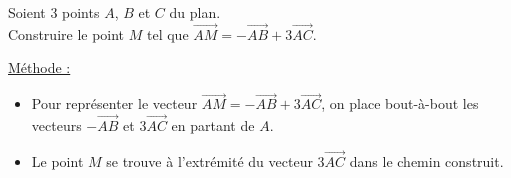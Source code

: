 \documentclass[12pt]{article}
\begin{document}
\begin{mdframed}[
    linewidth=1pt,
    roundcorner=5pt,
    linecolor=RoyalBlue,
    innertopmargin=10pt,
    innerbottommargin=10pt
]
\begin{minipage}{.45\textwidth}
\end{minipage}%
\hfill
\begin{minipage}{.55\textwidth}%
    Soient 3 points $A$, $B$ et $C$ du plan.
    \vspace{5pt}\\Construire le point $M$ tel que $\overrightarrow{AM} = -\overrightarrow{AB} + 
    3\overrightarrow{AC}$.
\end{minipage}%

\vspace{10pt}

\underline{Méthode :}
\vspace{5pt}
\begin{itemize}
    \item Pour représenter le vecteur $\overrightarrow{AM} = -\overrightarrow{AB} + 
    3\overrightarrow{AC}$, on place bout-à-bout les vecteurs 
    $-\overrightarrow{AB}$ et $3\overrightarrow{AC}$ en partant de $A$.
    \item Le point $M$ se trouve à l'extrémité du vecteur $3\overrightarrow{AC}$ dans le chemin 
    construit.
\end{itemize}

\end{mdframed}

\end{document}
